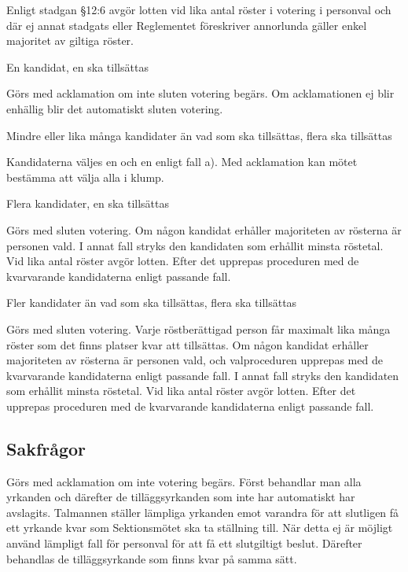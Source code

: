 \documentclass[10pt]{article}
\begin{document}
Enligt stadgan §12:6 avgör lotten vid lika antal röster i votering i personval och där ej annat stadgats eller Reglementet föreskriver annorlunda gäller enkel majoritet av giltiga röster.

\begin{alphlist}
\item En kandidat, en ska tillsättas

Görs med acklamation om inte sluten votering begärs. Om acklamationen ej blir
enhällig blir det automatiskt sluten votering.

\item Mindre eller lika många kandidater än vad som ska tillsättas, flera ska tillsättas

Kandidaterna väljes en och en enligt fall a). Med acklamation kan mötet bestämma att välja alla i klump.

\item Flera kandidater, en ska tillsättas

Görs med sluten votering. Om någon kandidat erhåller majoriteten av rösterna är personen vald. I annat fall stryks den kandidaten som erhållit minsta röstetal. Vid lika antal röster avgör lotten. Efter det upprepas proceduren med de kvarvarande kandidaterna enligt passande fall.

\item Fler kandidater än vad som ska tillsättas, flera ska tillsättas

Görs med sluten votering. Varje röstberättigad person får maximalt lika många röster som det finns platser kvar att tillsättas. Om någon kandidat erhåller majoriteten av rösterna är personen vald, och valproceduren upprepas med de kvarvarande kandidaterna enligt passande fall. I annat fall stryks den kandidaten som erhållit minsta röstetal. Vid lika antal röster avgör lotten. Efter det upprepas proceduren med de kvarvarande kandidaterna enligt passande fall.
\end{alphlist}

\subsection{Sakfrågor}

Görs med acklamation om inte votering begärs. Först behandlar man alla yrkanden och därefter de tilläggsyrkanden som inte har automatiskt har avslagits. Talmannen ställer lämpliga yrkanden emot varandra för att slutligen få ett yrkande kvar som Sektionsmötet ska ta ställning till. När detta ej är möjligt använd lämpligt fall för personval för att få ett slutgiltigt beslut. Därefter behandlas de tilläggsyrkande som finns kvar på samma sätt.
\end{document}
